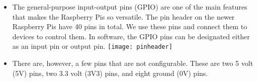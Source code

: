 \documentclass{article}\usepackage[]{graphicx}\usepackage[]{color}
\begin{document}
\begin{itemize}

\item The general-purpose input-output pins (GPIO) are one of the main features that makes the Raspberry Pis so versatile. The pin header on the newer Raspberry Pis have 40 pins in total. We use these pins and connect them to devices to control them. In software, the GPIO pins can be designated either as an input pin or output pin.
\newline
\newline
\texttt{[image: pinheader]}
\item There are, however, a few pins that are not configurable. These are two 5 volt (5V) pins, two 3.3 volt (3V3) pins, and eight ground (0V) pins.
\newline
\newline
\begin{center}

\end{center}
\end{itemize}
\end{document}
